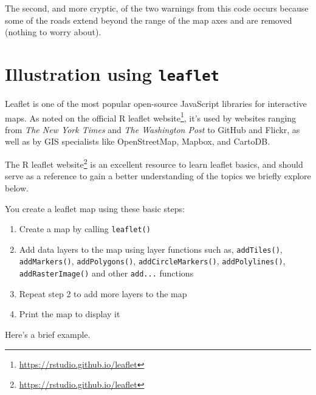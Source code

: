 \documentclass[]{krantz}
\makeatletter
\newenvironment{Shaded}{\begin{snugshade}}{\end{snugshade}}
\newcommand{\KeywordTok}[1]{\textcolor[rgb]{0.27,0.27,0.27}{\textbf{#1}}}
\newcommand{\DataTypeTok}[1]{\textcolor[rgb]{0.27,0.27,0.27}{#1}}
\newcommand{\FloatTok}[1]{\textcolor[rgb]{0.06,0.06,0.06}{#1}}
\newcommand{\StringTok}[1]{\textcolor[rgb]{0.5,0.5,0.5}{#1}}
\newcommand{\CommentTok}[1]{\textcolor[rgb]{0.37,0.37,0.37}{\textit{#1}}}
\newcommand{\OperatorTok}[1]{\textcolor[rgb]{0.43,0.43,0.43}{\textbf{#1}}}
\newcommand{\ErrorTok}[1]{\textcolor[rgb]{0.14,0.14,0.14}{\textbf{#1}}}
\newcommand{\NormalTok}[1]{#1}
\providecommand{\tightlist}{%
  \setlength{\itemsep}{0pt}\setlength{\parskip}{0pt}}
\renewcommand{\href}[2]{#2\footnote{\url{#1}}}
\newenvironment{kframe}{%
\medskip{}
\setlength{\fboxsep}{.8em}
 \def\at@end@of@kframe{}%
 \ifinner\ifhmode%
  \def\at@end@of@kframe{\end{minipage}}%
  \begin{minipage}{\columnwidth}%
 \fi\fi%
 \def\FrameCommand##1{\hskip\@totalleftmargin \hskip-\fboxsep
 \colorbox{shadecolor}{##1}\hskip-\fboxsep
     \hskip-\linewidth \hskip-\@totalleftmargin \hskip\columnwidth}%
 \MakeFramed {\advance\hsize-\width
   \@totalleftmargin\z@ \linewidth\hsize
   \@setminipage}}%
 {\par\unskip\endMakeFramed%
 \at@end@of@kframe}
\renewenvironment{Shaded}{\begin{kframe}}{\end{kframe}}
\theoremstyle{definition}
\theoremstyle{definition}
\theoremstyle{definition}
\theoremstyle{remark}
\makeatother
\begin{document}
The second, and more cryptic, of the two warnings from this code occurs
because some of the roads extend beyond the range of the map axes and
are removed (nothing to worry about).

\section{\texorpdfstring{Illustration using
\texttt{leaflet}}{Illustration using leaflet}}\label{illustration-using-leaflet}

Leaflet is one of the most popular open-source JavaScript libraries for
interactive maps. As noted on the official
\href{https://rstudio.github.io/leaflet}{R leaflet website}, it's used
by websites ranging from \emph{The New York Times} and \emph{The
Washington Post} to GitHub and Flickr, as well as by GIS specialists
like OpenStreetMap, Mapbox, and CartoDB.

The \href{https://rstudio.github.io/leaflet}{R leaflet website} is an
excellent resource to learn leaflet basics, and should serve as a
reference to gain a better understanding of the topics we briefly
explore below.

You create a leaflet map using these basic steps:

\begin{enumerate}
\def\labelenumi{\arabic{enumi}.}
\tightlist
\item
  Create a map by calling \texttt{leaflet()}
\item
  Add data layers to the map using layer functions such as,
  \texttt{addTiles()}, \texttt{addMarkers()}, \texttt{addPolygons()},
  \texttt{addCircleMarkers()}, \texttt{addPolylines()},
  \texttt{addRasterImage()} and other \texttt{add...} functions
\item
  Repeat step 2 to add more layers to the map
\item
  Print the map to display it
\end{enumerate}

Here's a brief example.

\begin{Shaded}
\end{Shaded}
\end{document}
